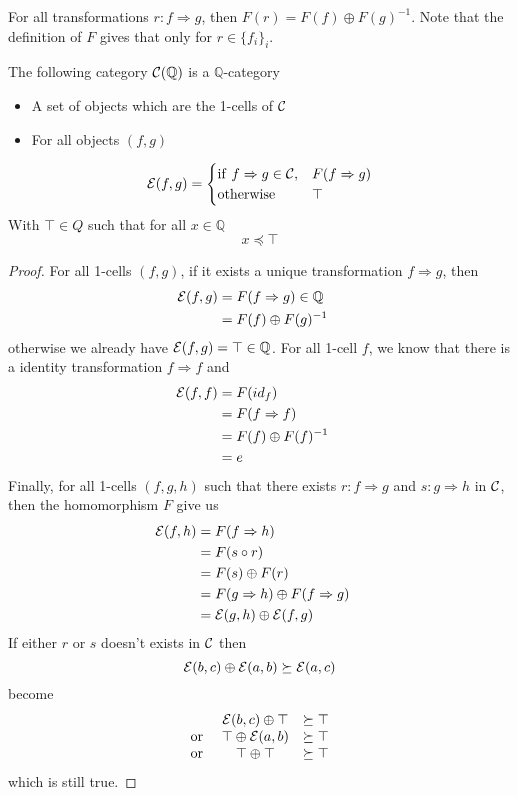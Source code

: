 \documentclass[a4paper]{article}
\begin{document}
\begin{corollary}
For all transformations $r: f \Rightarrow g$, then $F(r) = F(f) \oplus F(g)^{-1}$.
Note that the definition of $F$ gives that only for $r \in \{f_i\}_i$.
\end{corollary}

\begin{proposition}
The following category ${\cal C}(\mathbb{Q})$ is a $\mathbb{Q}$-category
\begin{itemize}
\item A set of objects which are the 1-cells of ${\cal C}$
\item For all objects $(f, g)$
\end{itemize}
\[
{\cal E}(f, g) = \begin{cases} {\rm if~} f \Rightarrow g \in {\cal C}, &F(f \Rightarrow g) \cr {\rm otherwise~} &\top \end{cases}
\]
With $\top \in Q$ such that for all $x \in \mathbb{Q}$
\[
x \preceq \top
\]

\begin{proof}
For all 1-cells $(f, g)$, if it exists a unique transformation $f \Rightarrow g$, then
\begin{align}
{\cal E}(f, g) &= F(f \Rightarrow g) \in \mathbb{Q} \cr
&= F(f) \oplus F(g)^{-1}
\end{align}
otherwise we already have ${\cal E}(f, g) = \top \in \mathbb{Q}$.
For all 1-cell $f$, we know that there is a identity transformation $f \Rightarrow f$ and
\begin{align}
{\cal E}(f, f) &= F(id_f) \cr
&= F(f \Rightarrow f)\cr
&= F(f) \oplus F(f)^{-1} \cr
&= e
\end{align}
Finally, for all 1-cells $(f, g, h)$ such that there exists $r: f \Rightarrow g$ and $s: g \Rightarrow h$ in ${\cal C}$, then the homomorphism $F$ give us
\begin{align}
{\cal E}(f, h) &= F(f \Rightarrow h) \cr
&= F(s\circ r) \cr
&= F(s) \oplus F(r) \cr
&= F(g \Rightarrow h) \oplus F(f \Rightarrow g) \cr
&= {\cal E}(g, h) \oplus {\cal E}(f, g)
\end{align}
If either $r$ or $s$ doesn't exists in ${\cal C}$ then
\[
{\cal E}(b, c) \oplus {\cal E}(a, b) \succeq {\cal E}(a, c)
\]
become
\[\begin{matrix}
&{\cal E}(b, c) \oplus \top &\succeq \top \cr
{\rm or~} &\top \oplus {\cal E}(a, b) &\succeq \top \cr
{\rm or~} &\top \oplus \top &\succeq \top
\end{matrix}\]
which is still true.
\end{proof}
\end{proposition}
\end{document}
